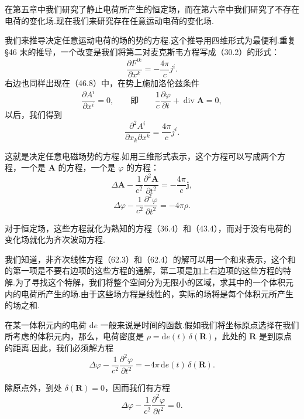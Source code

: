 在第五章中我们研究了静止电荷所产生的恒定场，而在第六章中我们研究了不存在电荷的变化场.现在我们来研究存在任意运动电荷的变化场.

我们来推导决定任意运动电荷的场的势的方程.这个推导用四维形式为最便利.重复 §46 末的推导，一个改变是我们将第二对麦克斯韦方程写成（30.2）的形式：
\begin{equation*}
  \frac{\partial F^{ik}}{\partial x^k}=-\frac{4\pi}{c}j^i.
\end{equation*}
右边也同样出现在（46.8）中，在势上施加洛伦兹条件
\begin{equation}
  \frac{\partial A^i}{\partial x^i}=0,\qquad\text{即}\qquad
  \frac{1}{c}\frac{\partial\varphi}{\partial t}+\operatorname{div}\boldsymbol{A}=0,
\end{equation}
以后，我们得到
\begin{equation}
  \frac{\partial^2 A^i}{\partial x_k\partial x^k}=\frac{4\pi}{c}j^i.
\end{equation}

这就是决定任意电磁场势的方程.如用三维形式表示，这个方程可以写成两个方程，一个是 $\boldsymbol{A}$ 的方程，一个是 $\varphi$ 的方程：
\begin{equation}
  \Delta\boldsymbol{A}-\frac{1}{c^2}\frac{\partial^2\boldsymbol{A}}{\partial t^2}
  =-\frac{4\pi}{c}\boldsymbol{j},
\end{equation}
\begin{equation}
  \Delta\varphi-\frac{1}{c^2}\frac{\partial^2\varphi}{\partial t^2}=-4\pi\rho.
\end{equation}

对于恒定场，这些方程就化为熟知的方程（36.4）和（43.4），而对于没有电荷的变化场就化为齐次波动方程.

我们知道，非齐次线性方程（62.3）和（62.4）的解可以用一个和来表示，这个和的第一项是不要右边项的这些方程的通解，第二项是加上右边项的这些方程的特解.为了寻找这个特解，我们将整个空间分为无限小的区域，求其中的一个体积元内的电荷所产生的场.由于这些场方程是线性的，实际的场将是每个体积元所产生的场之和.

在某一体积元内的电荷 $\mathrm{d}e$ 一般来说是时间的函数.假如我们将坐标原点选择在我们所考虑的体积元内，那么，电荷密度是 $\rho=\mathrm{d}e(t)\,\delta(\boldsymbol{R})$，此处的 $\boldsymbol{R}$ 是到原点的距离.因此，我们必须解方程
\begin{equation}
  \Delta\varphi-\frac{1}{c^2}\frac{\partial^2\varphi}{\partial t^2}
  =-4\pi\,\mathrm{d}e(t)\,\delta(\boldsymbol{R}).
\end{equation}

除原点外，到处 $\delta(\boldsymbol{R})=0$，因而我们有方程
\begin{equation}
  \Delta\varphi-\frac{1}{c^2}\frac{\partial^2\varphi}{\partial t^2}=0.
\end{equation}


